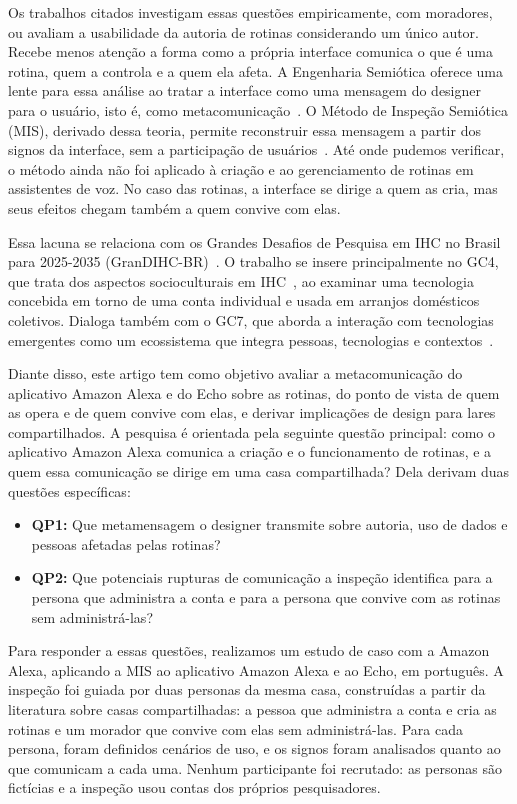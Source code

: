 Os trabalhos citados investigam essas questões empiricamente, com
moradores, ou avaliam a usabilidade da autoria de rotinas considerando um
único autor. Recebe menos atenção a forma como a própria interface comunica
o que é uma rotina, quem a controla e a quem ela afeta. A Engenharia
Semiótica oferece uma lente para essa análise ao tratar a interface como
uma mensagem do designer para o usuário, isto é, como
metacomunicação~\cite{desouza2005semiotic}. O Método de Inspeção Semiótica
(MIS), derivado dessa teoria, permite reconstruir essa mensagem a partir
dos signos da interface, sem a participação de
usuários~\cite{desouza2006sim,desouza2009methods}. Até onde pudemos
verificar, o método ainda não foi aplicado à criação e ao gerenciamento de
rotinas em assistentes de voz. No caso das rotinas, a interface se dirige a
quem as cria, mas seus efeitos chegam também a quem convive com elas.

Essa lacuna se relaciona com os Grandes Desafios de Pesquisa em IHC no
Brasil para 2025-2035 (GranDIHC-BR)~\cite{pereira2024grandihc}. O trabalho
se insere principalmente no GC4, que trata dos aspectos socioculturais em
IHC~\cite{neris2024gc4}, ao examinar uma tecnologia concebida em torno de
uma conta individual e usada em arranjos domésticos coletivos. Dialoga
também com o GC7, que
aborda a interação com tecnologias emergentes como um ecossistema que
integra pessoas, tecnologias e contextos~\cite{zaina2024gc7}.

Diante disso, este artigo tem como objetivo avaliar a metacomunicação do
aplicativo Amazon Alexa e do Echo sobre as rotinas, do ponto de vista de
quem as opera e de quem convive com elas, e derivar implicações de design
para lares compartilhados. A pesquisa é orientada pela seguinte questão
principal: como o aplicativo Amazon Alexa comunica a criação e o
funcionamento de rotinas, e a quem essa comunicação se dirige em uma casa
compartilhada? Dela derivam duas questões específicas:

\begin{itemize}
  \item \textbf{QP1:} Que metamensagem o designer transmite sobre autoria,
        uso de dados e pessoas afetadas pelas rotinas?
  \item \textbf{QP2:} Que potenciais rupturas de comunicação a inspeção
        identifica para a persona que administra a conta e para a persona
        que convive com as rotinas sem administrá-las?
\end{itemize}

Para responder a essas questões, realizamos um estudo de caso com a Amazon
Alexa, aplicando a MIS ao aplicativo Amazon Alexa e ao Echo, em português.
A inspeção foi guiada por duas personas da mesma casa, construídas a
partir da literatura sobre casas compartilhadas: a pessoa que administra a
conta e cria as rotinas e um morador que convive com elas sem
administrá-las. Para cada persona, foram definidos cenários de uso, e os
signos foram analisados quanto ao que comunicam a cada uma. Nenhum
participante foi recrutado: as personas são fictícias e a inspeção usou
contas dos próprios pesquisadores.


